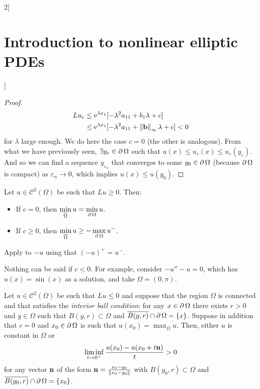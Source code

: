 \documentclass[../../../main_math.tex]{subfiles}
\begin{document}
\begin{multicols}{2}[\section{Introduction to nonlinear elliptic PDEs}]
\begin{proof}
    \begin{align*}
      Lu_\varepsilon & \leq \mathrm{e}^{\lambda x_1}[-\lambda^2a_{11}+b_1\lambda+c]                    \\
                     & \leq \mathrm{e}^{\lambda x_1}[-\lambda^2a_{11}+\left\|\boldsymbol{\mathrm{b}}\right\|_\infty\lambda+c]<0
    \end{align*}
    for $\lambda$ large enough. We do here the case $c=0$ (the other is analogous). From what we have previously seen, $\exists y_\varepsilon\in\operatorname{\partial}{\Omega}$ such that $u(x)\leq u_\varepsilon(x)\leq u_\varepsilon(y_\varepsilon)$. And so we can find a sequence $y_{\varepsilon_n}$ that converges to some $y_0\in\operatorname{\partial}{\Omega}$ (because $\operatorname{\partial}{\Omega}$ is compact) as $\varepsilon_n\to 0$, which implies $u(x)\leq u(y_0)$.
  \end{proof}
  \begin{theorem}
    Let $u\in \mathcal{C}^2(\Omega)$ be such that $Lu\geq 0$. Then:
    \begin{itemize}
      \item If $c=0$, then $\displaystyle \min_{\overline{\Omega}}u=\min_{\operatorname{\partial}{\Omega}}u$.
      \item If $c\geq 0$, then $\displaystyle \min_{\overline{\Omega}} u \geq -\max_{\operatorname{\partial}{\Omega}}u^-$.
    \end{itemize}
  \end{theorem}
  \begin{sproof}
    Apply  to $-u$ using that ${(-u)}^+=u^-$.
  \end{sproof}
  \begin{remark}
    Nothing can be said if $c<0$. For example, consider $-u''-u=0$, which has $u(x)=\sin(x)$ as a solution, and take $\Omega=(0,\pi)$.
  \end{remark}
  \begin{lemma}\label{INEPDE:Hopf}
    Let $u\in \mathcal{C}^2(\Omega)$ be such that $Lu\leq 0$ and suppose that the region $\Omega$ is connected and that satisfies the \emph{interior ball condition}: for any $x\in \operatorname{\partial}{\Omega}$ there exists $r>0$ and $y\in \Omega$ such that $B(y,r)\subset \Omega$ and $\overline{B(y,r)}\cap \operatorname{\partial}{\Omega}=\{x\}$. Suppose in addition that $c=0$ and $x_0\in\operatorname{\partial}\Omega$ is such that $\displaystyle u(x_0)=\max_{\overline{\Omega}}u$. Then, either $u$ is constant in $\Omega$ or
    $$
      \liminf_{t\to 0^+}\frac{u(x_0) - u(x_0+t\boldsymbol{\mathrm{n}})}{t}>0
    $$
    for any vector $\boldsymbol{\mathrm{n}}$ of the form $\boldsymbol{\mathrm{n}}=\frac{x_0-y_0}{\left\|x_0-y_0\right\|}$ with $B(y_0,r)\subset \Omega$ and $\overline{B(y_0,r)}\cap \operatorname{\partial}{\Omega}=\{x_0\}$.

\end{lemma}
\end{multicols}
\end{document}
